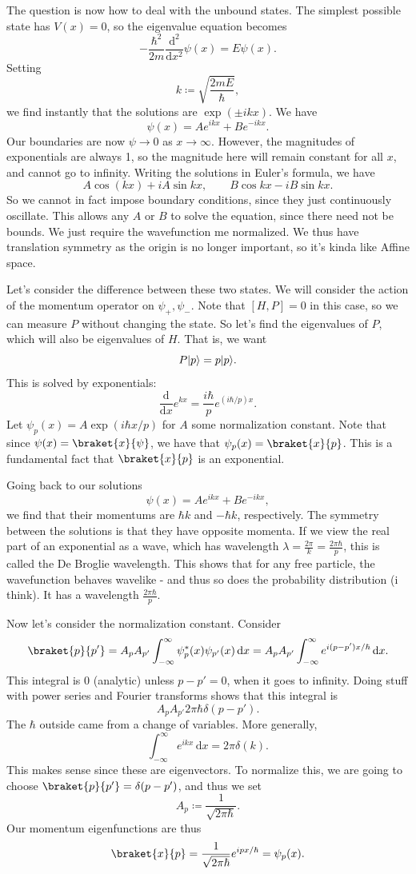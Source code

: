 The question is now how to deal with the unbound states. The simplest possible state has $V(x)=0$, so the eigenvalue equation becomes
\[
	-\frac{\hbar ^2}{2m} \frac{\mathrm{d}^2}{\mathrm{d}x^2} \psi (x)=E\psi (x)
.\]
Setting
\[
	k\coloneqq \sqrt{\frac{2mE}{\hbar } } ,
\]
we find instantly that the solutions are $\exp (\pm ikx)$. We have
\[
	\psi (x)=Ae^{ikx} +Be^{-ikx} 
.\]
Our boundaries are now $\psi \to 0$ as $x\to \infty $. However, the magnitudes of exponentials are always 1, so the magnitude here will remain constant for all $x$, and cannot go to infinity. Writing the solutions in Euler's formula, we have
\[
	A \cos (kx)+iA \sin kx,\qquad B \cos kx-iB \sin kx
.\]
So we cannot in fact impose boundary conditions, since they just continuously oscillate. This allows any $A$ or $B$ to solve the equation, since there need not be bounds. We just require the wavefunction me normalized. We thus have translation symmetry as the origin is no longer important, so it's kinda like Affine space.

Let's consider the difference between these two states. We will consider the action of the momentum operator on $\psi_+,\psi _-$. Note that $[H,P]=0$ in this case, so we can measure $P$ without changing the state. So let's find the eigenvalues of $P$, which will also be eigenvalues of $H$. That is, we want
\[
	P \lvert p\rangle =p\lvert p\rangle 
.\]
This is solved by exponentials:
\[
	\frac{\mathrm{d}}{\mathrm{d}x}  e^{kx} = \frac{i\hbar }{p}e^{(i \hbar /p)x} 
.\]
Let $\psi_p(x)=A\exp (i \hbar x/p)$ for $A$ some normalization constant. Note that since $\psi (x)=\braket{x}{\psi } $, we have that $\psi _p(x)=\braket{x}{p} $. This is a fundamental fact that $\braket{x}{p} $ is an exponential.

Going back to our solutions
\[
	\psi(x)=Ae^{ikx} +Be^{-ikx} ,
\]
we find that their momentums are $\hbar k$ and $-\hbar k$, respectively. The symmetry between the solutions is that they have opposite momenta. If we view the real part of an exponential as a wave, which has wavelength $\lambda =\frac{2\pi }{k} =\frac{2\pi \hbar }{p}$, this is called the De Broglie wavelength. This shows that for any free particle, the wavefunction behaves wavelike - and thus so does the probability distribution (i think). It has a wavelength $\frac{2\pi \hbar }{p} $.

Now let's consider the normalization constant. Consider
\[
	\braket{p}{p'} =A_pA_{p'} \int_{-\infty }^{\infty } \psi ^*_p(x)\psi _{p'} (x) \,\mathrm{d} x=A_pA_{p'} \int_{-\infty }^{\infty } e^{i(p-p')x/\hbar }  \,\mathrm{d} x
.\]
This integral is $0$ (analytic) unless $p-p'=0$, when it goes to infinity. Doing stuff with power series and Fourier transforms shows that this integral is
\[
	A_pA_{p'} 2\pi \hbar \delta (p-p')
.\]
The $\hbar $ outside came from a change of variables. More generally,
\[
	\int_{-\infty }^{\infty } e^{ikx}  \,\mathrm{d} x=2\pi \delta (k)
.\]
This makes sense since these are eigenvectors. To normalize this, we are going to choose $\braket{p}{p'} =\delta (p-p')$, and thus we set
\[
	A_p\coloneqq \frac{1}{\sqrt{2\pi \hbar } } 
.\]
Our momentum eigenfunctions are thus
\[
	\braket{x}{p} =\frac{1}{\sqrt{2\pi \hbar } } e^{ipx/\hbar } =\psi_p(x)
.\]

